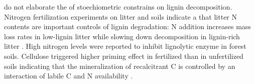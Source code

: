 \documentclass[authoryear,preprint,review,12pt]{elsarticle}
\begin{document}
                                                                                                                                                                                                                                                                                                                                                                                                                                                                                                                                                                                                                                                                                                                                                                                                                                                                                                                                                                                                                                                                                                                              \cite{Klotzbucher2011} do not elaborate the of stoechiometric constrains on lignin decomposition. Nitrogen fertilization experiments on litter and soils indicate a that litter N contents are important controls of lignin degradation: N addition increases mass loss rates in low-lignin litter while slowing down decomposition in lignin-rich litter \citep{Knorr2005}. High nitrogen levels were reported to inhibit lignolytic enzyme in forest soils\citep{Sinsabaugh2010}. Cellulose triggered higher priming effect in fertilized than in unfertilized soils indicating that the mineralization of recalcitrant C is controlled by an interaction of labile C and N availability \citep{Fontaine2011}.
\end{document}
